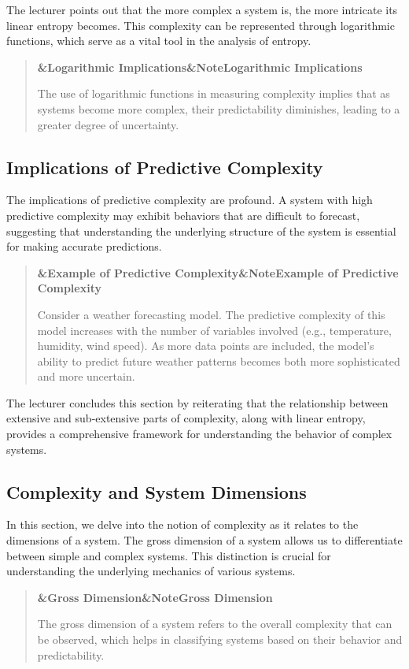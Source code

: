 \documentclass[a4paper]{article}
\newcommand{\boxheading}[1]{%
  \par\smallskip
  \noindent\textbf{\ifx&#1&Note\else#1\fi}\par
  \smallskip
}
\newenvironment{defbox}[1][]{%
  \begin{quote}\color{green!40!black}\boxheading{#1}\normalcolor
}{\end{quote}}
\newenvironment{exbox}[1][]{%
  \begin{quote}\color{brown!70!black}\boxheading{#1}\normalcolor
}{\end{quote}}
\newenvironment{rembox}[1][]{%
  \begin{quote}\color{black!70}\boxheading{#1}\normalcolor
}{\end{quote}}
\begin{document}
The lecturer points out that the more complex a system is, the more intricate its linear entropy becomes. This complexity can be represented through logarithmic functions, which serve as a vital tool in the analysis of entropy.

\begin{rembox}[Logarithmic Implications]
The use of logarithmic functions in measuring complexity implies that as systems become more complex, their predictability diminishes, leading to a greater degree of uncertainty.
\end{rembox}

\subsection{Implications of Predictive Complexity}
The implications of predictive complexity are profound. A system with high predictive complexity may exhibit behaviors that are difficult to forecast, suggesting that understanding the underlying structure of the system is essential for making accurate predictions.

\begin{exbox}[Example of Predictive Complexity]
Consider a weather forecasting model. The predictive complexity of this model increases with the number of variables involved (e.g., temperature, humidity, wind speed). As more data points are included, the model's ability to predict future weather patterns becomes both more sophisticated and more uncertain.
\end{exbox}

The lecturer concludes this section by reiterating that the relationship between extensive and sub-extensive parts of complexity, along with linear entropy, provides a comprehensive framework for understanding the behavior of complex systems.

\subsection{Complexity and System Dimensions}
In this section, we delve into the notion of complexity as it relates to the dimensions of a system. The gross dimension of a system allows us to differentiate between simple and complex systems. This distinction is crucial for understanding the underlying mechanics of various systems.

\begin{defbox}[Gross Dimension]
The gross dimension of a system refers to the overall complexity that can be observed, which helps in classifying systems based on their behavior and predictability.
\end{defbox}
\end{document}
